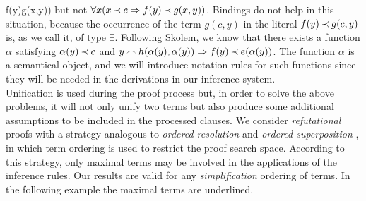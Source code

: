 f(y)\Incl g(x,y))\) but not \(\forall x(x\mathbin{\prec} c\mathrel\Rightarrow f(y)\mathbin{\prec} g(x,y))\).
Bindings do not help in this situation, because the occurrence of the term $g(c,y)$ 
in the literal \(f(y)\mathbin{\prec} g(c,y)\) is, as we call it, of type $\exists$.  
Following Skolem, we know that
there exists a function $\alpha$ satisfying \(\alpha(y)\mathbin{\prec} c\) and \(y\mathbin{\frown}
h(\alpha(y),\alpha(y))\mathrel\Rightarrow f(y)\mathbin{\prec} e(\alpha(y))\).  The function $\alpha$
is a semantical object, and we will introduce notation rules for such
functions since they will be needed in the derivations in
our inference system.\\[1ex]
%
Unification is used during the proof process but, in order to solve the
above problems, it will not only unify two terms but also produce some
additional assumptions to be included in the processed clauses.
 We consider {\em refutational} proofs with a strategy
analogous to {\em ordered resolution} and {\em ordered superposition}
\cite{BG,PP}, in which term ordering is used to restrict the proof
search space.  According to this strategy, only maximal terms may be
involved in the applications of the inference rules. Our results are
valid for any {\em simplification} ordering
\cite {Der} of terms.  In the following example the maximal terms are underlined.

